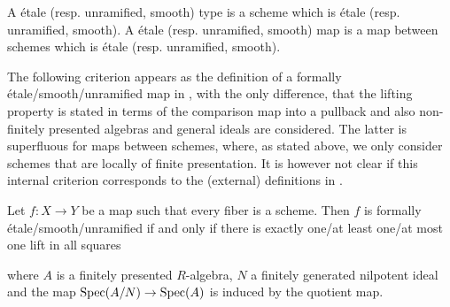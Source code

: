 \begin{definition}
  A étale (resp. unramified, smooth) type is a scheme which is étale (resp. unramified, smooth).
  A étale (resp. unramified, smooth) map is a map between schemes which is étale (resp. unramified, smooth).
\end{definition}

The following criterion appears as the definition of a formally étale/smooth/unramified map in \cite[§17]{EGAIV4},
with the only difference, that the lifting property is stated in terms of the comparison map into a pullback and also non-finitely presented algebras and general ideals are considered. The latter is superfluous for maps between schemes, where, as stated above, we only consider schemes that are locally of finite presentation. It is however not clear if this internal criterion corresponds to the (external) definitions in \cite[§17]{EGAIV4}.

\begin{remark}
  \label{connection-to-ega-definition}
  Let $f:X\to Y$ be a map such that every fiber is a scheme.
  Then $f$ is formally étale/smooth/unramified if and only if there is exactly one/at least one/at most one lift in all squares
  \begin{center}
  \end{center}
where $A$ is a finitely presented $R$-algebra, $N$ a finitely generated nilpotent ideal and the map $\operatorname{Spec}(A/N)\to\operatorname{Spec}(A)$ is induced by the quotient map.
\end{remark}

